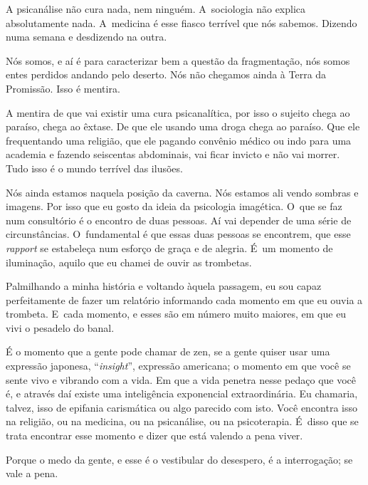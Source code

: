  

A psicanálise não cura nada, nem ninguém. A~sociologia não explica
absolutamente nada. A~medicina é esse fiasco terrível que nós sabemos.
Dizendo numa semana e desdizendo na outra.

 

Nós somos, e aí é para caracterizar bem a questão da fragmentação, nós
somos entes perdidos andando pelo deserto. Nós não chegamos ainda à
Terra da Promissão. Isso é mentira.

 

A mentira de que vai existir uma cura psicanalítica, por isso o
sujeito chega ao paraíso, chega ao êxtase. De que ele usando uma droga
chega ao paraíso. Que ele frequentando uma religião, que ele pagando
convênio médico ou indo para uma academia e fazendo seiscentas
abdominais, vai ficar invicto e não vai morrer. Tudo isso é o mundo
terrível das ilusões.

 

Nós ainda estamos naquela posição da caverna. Nós estamos ali vendo
sombras e imagens. Por isso que eu gosto da ideia da psicologia
imagética. O~que se faz num consultório é o encontro de duas pessoas. Aí
vai depender de uma série de circunstâncias. O~fundamental é que essas
duas pessoas se encontrem, que esse \emph{rapport} se estabeleça num esforço de
graça e de alegria. É~um momento de iluminação, aquilo que eu chamei de
ouvir as trombetas.

 

Palmilhando a minha história e voltando àquela passagem, eu sou capaz
perfeitamente de fazer um relatório informando cada momento em que eu
ouvia a trombeta. E~cada momento, e esses são em número muito maiores,
em que eu vivi o pesadelo do banal.

 

É o momento que a gente pode chamar de zen, se a gente quiser usar uma
expressão japonesa, ``\emph{insight}'', expressão americana; o momento em que
você se sente vivo e vibrando com a vida. Em que a vida penetra nesse
pedaço que você é, e através daí existe uma inteligência exponencial
extraordinária. Eu chamaria, talvez, isso de epifania carismática ou algo
parecido com isto. Você encontra isso na religião, ou na medicina, ou na
psicanálise, ou na psicoterapia. É~disso que se trata encontrar esse
momento e dizer que está valendo a pena viver.

 

Porque o medo da gente, e esse é o vestibular do desespero, é a
interrogação; se vale a pena.

